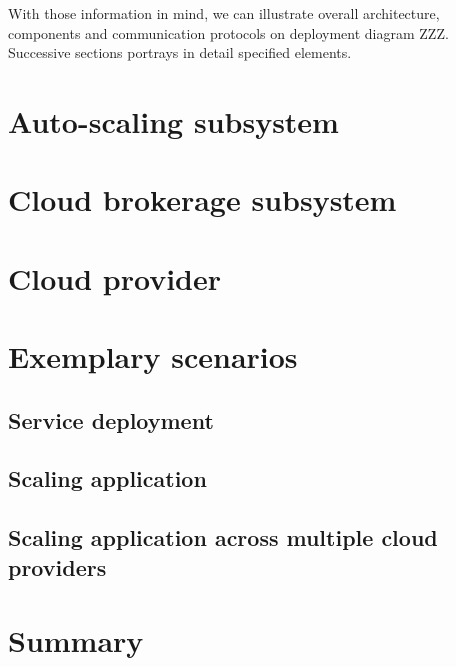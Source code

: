 With those information in mind, we can illustrate overall architecture, components and communication protocols on deployment diagram ZZZ. Successive sections portrays in detail specified elements.

\section{Auto-scaling subsystem}

\section{Cloud brokerage subsystem}

\section{Cloud provider}

\section{Exemplary scenarios}

\subsection{Service deployment}

\subsection{Scaling application}

\subsection{Scaling application across multiple cloud providers}

\section{Summary}

